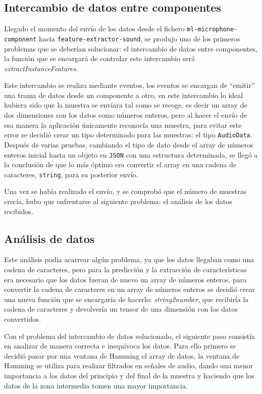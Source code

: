 \documentclass[a4paper, 12pt]{book}
\begin{document}
\subsection{Intercambio de datos entre componentes}
\label{subsec:intercambio-datos}

Llegado el momento del envío de los datos desde el fichero \texttt{ml-microphone-component} hacia \texttt{feature-extractor-sound}, se produjo uno de los primeros problemas que se deberían solucionar: el intercambio de datos entre componentes, la función que se encargará de controlar este intercambio será \textit{extractInstanceFeatures}.

Este intercambio se realiza mediante eventos, los eventos se encargan de ``emitir'' una trama de datos desde un componente a otro, en este intercambio lo ideal hubiera sido que la muestra se enviara tal como se recoge, es decir un array de dos dimensiones con los datos como números enteros, pero al hacer el envío de esa manera la aplicación únicamente reconocía una muestra, para evitar este error se decidió crear un tipo determinado para las muestras: el tipo \texttt{AudioData}. Después de varias pruebas, cambiando el tipo de dato desde el array de números enteros inicial hasta un objeto en \texttt{JSON} con una estructura determinada, se llegó a la conclusión de que lo más óptimo era convertir el array en una cadena de caracteres, \texttt{string}, para su posterior envío.

Una vez se había realizado el envío, y se comprobó que el número de muestras crecía, hubo que enfrentarse al siguiente problema: el análisis de los datos recibidos.

\subsection{Análisis de datos}
\label{subsec:analisis-datos}

Este análisis podía acarrear algún problema, ya que los datos llegaban como una cadena de caracteres, pero para la predicción y la extracción de características era necesario que los datos fueran de nuevo un array de números enteros, para convertir la cadena de caracteres en un array de números enteros se decidió crear una nueva función que se encargaría de hacerlo: \textit{string2number}, que recibiría la cadena de caracteres y devolvería un tensor de una dimensión con los datos convertidos.

Con el problema del intercambio de datos solucionado, el siguiente paso consistía en analizar de manera correcta e inequívoca los datos. Para ello primero se decidió pasar por una ventana de Hamming el array de datos, la ventana de Hamming se utiliza para realizar filtrados en señales de audio, dando una menor importancia a los datos del principio y del final de la muestra y haciendo que los datos de la zona intermedia tomen una mayor importancia.
\end{document}
